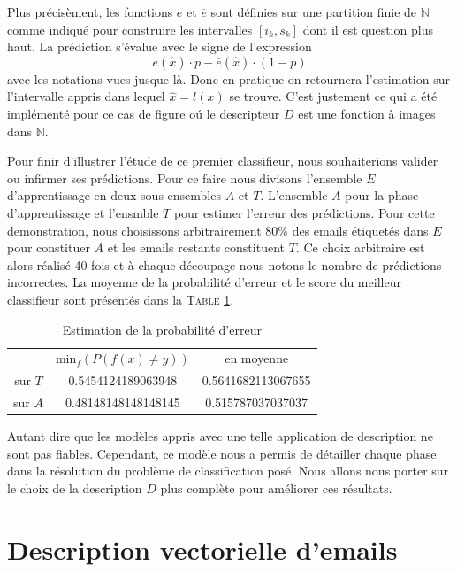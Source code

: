 \documentclass[a4paper, french]{article}
\begin{document}
Plus pr\'ecis\`ement, les fonctions $e$ et $\overline{e}$ sont d\'efinies 
sur une partition finie de $\mathbb{N}$ comme indiqu\'e
pour construire les intervalles $[i_k,s_k]$ dont il est question plus haut.
La pr\'ediction s'\'evalue avec le signe de l'expression
\begin{equation}
    e(\hat{x}) \cdot p - \overline{e}(\hat{x}) \cdot (1-p)
\end{equation}
avec les notations vues jusque l\`a. Donc en pratique on retournera l'estimation 
sur l'intervalle appris dans lequel $\hat{x}=l(x)$ se trouve. C'est justement ce
qui a \'et\'e impl\'ement\'e pour ce cas de figure o\'u le descripteur $D$ est une
fonction \`a images dans $\mathbb{N}$.

Pour finir d'illustrer l'\'etude de ce premier classifieur, nous souhaiterions
valider ou infirmer ses pr\'edictions. Pour ce faire nous divisons
l'ensemble $E$ d'apprentissage en deux sous-ensembles $A$ et $T$. 
L'ensemble $A$ pour la phase d'apprentissage et l'ensmble $T$ pour 
estimer l'erreur des pr\'edictions. Pour cette demonstration, 
nous choisissons arbitrairement $80\%$ des emails \'etiquet\'es dans $E$ 
pour constituer $A$ et les emails restants constituent $T$. Ce choix arbitraire
est alors r\'ealis\'e 40 fois et \`a chaque d\'ecoupage nous notons le nombre
de pr\'edictions incorrectes. La moyenne de la probabilit\'e d'erreur et
le score du meilleur classifieur sont pr\'esent\'es dans la T\textsc{able}
\ref{tbl:erreur_exo2}.

\begin{table}[h]
\begin{center}
    \caption{Estimation de la probabilit\'e d'erreur}
    \vskip 4mm
    \begin{tabular}{ccc}
        &min$_f(P(f(x)\neq y))$&en moyenne\\
        sur $T$&0.5454124189063948&0.5641682113067655\\
        sur $A$&0.48148148148148145&0.515787037037037
    \end{tabular}
    \label{tbl:erreur_exo2}
\end{center}
\end{table}

Autant dire que les mod\`eles appris avec une telle application de description
ne sont pas fiables. Cependant, ce mod\`ele nous a permis de d\'etailler chaque
phase dans la r\'esolution du probl\`eme de classification pos\'e. Nous allons
nous porter sur le choix de la description $D$ plus compl\`ete pour am\'eliorer
ces r\'esultats.

\section{Description vectorielle d'emails}

\end{document}
